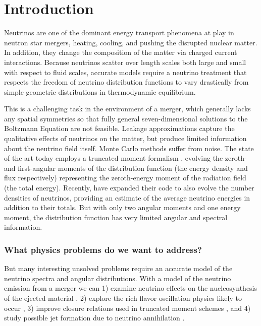 \documentclass[aps,prd,twocolumn,superscriptaddress]{revtex4-1}
\newcommand{\todo}[1]{\marginpar{\tiny{\textcolor{red}{#1}}}}
\begin{document}
\maketitle

\section{Introduction}
Neutrinos are one of the dominant energy transport phenomena at play in
neutron star mergers, heating, cooling, and pushing the disrupted nuclear
matter.
In addition, they change the composition of the matter via charged current
interactions.
Because neutrinos scatter over length scales both large and small with
respect to fluid scales, accurate models require a neutrino treatment that
respects the freedom of neutrino distribution functions to vary
drastically from simple geometric distributions in thermodynamic equilibrium.

This is a challenging task in the environment of a merger,
which generally lacks any spatial symmetries so that fully general
seven-dimensional solutions to the Boltzmann Equation are not feasible.
Leakage approximations
\citep{deat2013-leakage, pere2016-asl, radi2016-dynamical, ?}
capture the qualitative effects of neutrinos on the matter, but
produce limited information about the neutrino field itself.
Monte Carlo methods \citep{abdi2012-monte_carlo, rich2015-monte_carlo}
suffer from noise.
\todo{discuss mc more clearly}
The state of the art today employs a truncated moment formalism
\citep{shib2011-truncated_moment, fouc2015-m1_nsbh, fouc2016-m1_nsns,
  just2015-m1_code, ?},
evolving the zeroth- and first-angular moments of the distribution function
(the energy density and flux respectively) representing the zeroth-energy moment
of the radiation field (the total energy).
Recently, \cite{fouc2016-m1_evolve_n} have expanded their code to also evolve
the number densities of neutrinos, providing an estimate of the average neutrino
energies in addition to their totals.
But with only two angular moments and one energy moment, the distribution
function has very limited angular and spectral information.

\subsubsection*{What physics problems do we want to address?}
But many interesting unsolved problems require an accurate model of the neutrino
spectra and angular distributions.
With a model of the neutrino emission from a merger we can
1) examine neutrino effects on the nucleosynthesis of the ejected material
\citep{surm2011-nickel_56, robe2016-sph_nu_nucleo},
2) explore the rich flavor oscillation physics likely to occur
\citep{malk2012-mnr_1, malk2015-mnr_2, malk2016-mnr_3, zhu2016-mnr_nsns_remnant,
  vaan2016-uncovering_mnr},
3) improve closure relations used in truncated moment schemes
\citep{ramp2002-truncated_moment, shib2011-truncated_moment,
  card2013-truncated_moment, fouc2015-m1_nsbh, ocon2015-gr1d_with_nu}, and
4) study possible jet formation due to neutrino annihilation
\citep{ruff1999-nunubar_nsns, asan2000-nunubar, birk2007-nunubar,
  hari2010-gr_nunubar_collapsar, zala2011-nunubar, leng2014-nunubar}.
\end{document}

